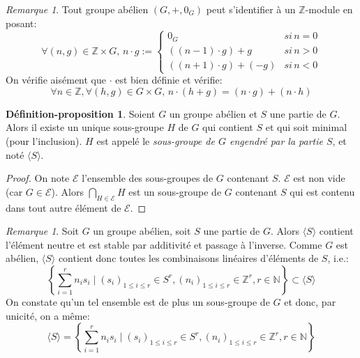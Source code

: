 \documentclass{report}
\newcommand{\Z}{\mathbb{Z}}
\newcommand{\N}{\mathbb{N}}
\newcommand{\dis}{\displaystyle}
\theoremstyle{definition}
\newtheorem{depro}[defi]{Définition-proposition}
\theoremstyle{remark}
\newtheorem{rem}[defi]{Remarque}
\begin{document}


\begin{rem}
Tout groupe ab\'elien $(G,+,0_G)$ peut s'identifier \`a un $\Z$-module en posant:
$$\forall (n,g)\in\Z\times G,\, n\cdot g:=\begin{cases}0_G & si\, n=0\\ ((n-1)\cdot g)+g & si\, n>0\\((n+1)\cdot g) + (-g) & si\, n<0\end{cases}$$
On v\'erifie ais\'ement que $\cdot$ est bien d\'efinie et v\'erifie:\\
$$\forall n\in \Z,\forall (h,g)\in G\times G,\, n\cdot(h+g)=(n\cdot g)+(n\cdot h)$$
\end{rem}

\begin{depro}
Soient $G$ un groupe abélien et $S$ une partie de $G$. Alors il existe un unique sous-groupe $H$ de $G$ qui contient $S$ et qui soit minimal (pour l'inclusion). $H$ est appelé le \textit{sous-groupe de $G$ engendré par la partie $S$}, et noté $\langle S\rangle$.
\end{depro}

\begin{proof}
On note $\mathcal{E}$ l'ensemble des sous-groupes de $G$ contenant $S$. $\mathcal{E}$ est non vide (car $G \in\mathcal{E}$). Alors $\dis \bigcap_{H \in \mathcal{E}} H$ est un sous-groupe de $G$ contenant $S$ qui est contenu dans tout autre élément de $\mathcal{E}$.
\end{proof}

\begin{rem}
Soit $G$ un groupe abélien, soit $S$ une partie de $G$. Alors $\langle S\rangle$ contient l'élément neutre et est stable par additivité et passage à l'inverse. Comme $G$ est abélien, $\langle S\rangle$ contient donc toutes les combinaisons linéaires d'éléments de $S$, i.e.:
$$\left\{\dis \sum_{i=1}^r n_is_i \mid (s_i)_{1 \leqslant i \leqslant r} \in S^r, (n_i)_{1 \leqslant i \leqslant r} \in \Z^r, r \in \N \right\}\subset\langle S\rangle$$
On constate qu'un tel ensemble est de plus un sous-groupe de $G$ et donc, par unicité, on a m\^eme:
$$\langle S\rangle=\left\{\dis \sum_{i=1}^r n_is_i \mid (s_i)_{1 \leqslant i \leqslant r} \in S^r, (n_i)_{1 \leqslant i \leqslant r} \in \Z^r, r \in \N \right\}$$
\end{rem}
\end{document}
